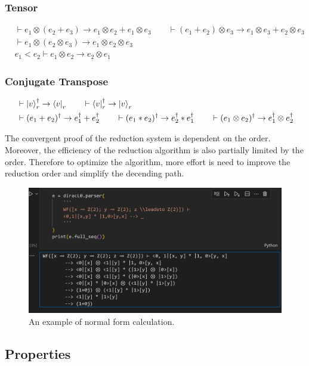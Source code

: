 \documentclass{article}
\begin{document}
\subsubsection*{Tensor}
\begin{align*}
  & \vdash e_1 \otimes (e_2 + e_3) \to e_1 \otimes e_2 + e_1 \otimes e_3
  \qquad \vdash (e_1 + e_2) \otimes e_3 \to e_1 \otimes e_3 + e_2 \otimes e_3\\
  & \vdash e_1 \otimes (e_2 \otimes e_3) \to e_1 \otimes e_2 \otimes e_3\\
  & e_1 < e_2 \vdash e_1 \otimes e_2 \to e_2 \otimes e_1
\end{align*}

\subsubsection*{Conjugate Transpose}
\begin{align*}
  & \vdash \ket{v}_r^\dagger \to \bra{v}_r \qquad \vdash \bra{v}_r^\dagger \to \ket{v}_r\\
  & \vdash (e_1 + e_2)^\dagger \to e_1^\dagger + e_2^\dagger \qquad \vdash (e_1 * e_2)^\dagger \to e_2^\dagger * e_1^\dagger \qquad \vdash (e_1 \otimes e_2)^\dagger \to e_1^\dagger \otimes e_2^\dagger
\end{align*}
  
  
The convergent proof of the reduction system is dependent on the order. Moreover, the efficiency of the reduction algorithm is also partially limited by the order. Therefore to optimize the algorithm, more effort is need to improve the reduction order and simplify the decending path.

\begin{figure}[h]
  \center
  \includegraphics*[width = 0.7 \textwidth]{fig/red_illustration.png}
  \caption{An example of normal form calculation.}
\end{figure}

\subsection{Properties}
\end{document}
